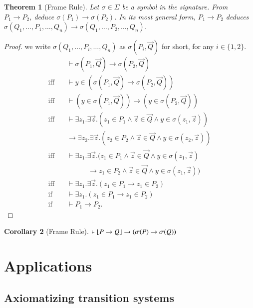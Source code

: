 \documentclass{article}
\theoremstyle{plain}
\newtheorem{thm}{Theorem}
\newtheorem{cor}[thm]{Corollary}
\DeclarePairedDelimiter\floor{\lfloor}{\rfloor}
\begin{document}
\begin{thm} [Frame Rule]
	Let $\sigma \in \Sigma$ be a symbol in the signature. From $P_1 \to P_2$, deduce $\sigma(P_1) \to \sigma(P_2)$. In its most general form, $P_1 \to P_2$ deduces $\sigma(Q_1,\dots,P_1,\dots,Q_n) \to \sigma(Q_1,\dots, P_2, \dots, Q_n)$.
\end{thm}
\begin{proof}
	we write $\sigma(Q_1,\dots,P_i,\dots,Q_n)$ as $\sigma(P_i,\vec{Q})$ for short, for any $i \in \{1,2\}$.
	\begin{align*}
	&\vdash \sigma(P_1, \vec{Q}) \to \sigma(P_2,\vec{Q}) \\
	\text{iff} \quad &\vdash y \in (\sigma(P_1, \vec{Q}) \to \sigma(P_2,\vec{Q})) \\
	\text{iff} \quad &\vdash (y \in \sigma(P_1, \vec{Q})) \to (y \in \sigma(P_2, \vec{Q})) \\
	\text{iff} \quad &\vdash \exists z_1 . \exists \vec{z} . (z_1 \in P_1 \wedge \vec{z} \in \vec{Q} \wedge y \in \sigma(z_1, \vec{z})) \\
	&\to \exists z_2 . \exists \vec{z} . (z_2 \in P_2 \wedge \vec{z} \in \vec{Q} \wedge y \in \sigma(z_2, \vec{z})) \\
	\text{iff} \quad &\vdash \exists z_1 . \exists \vec{z} . (z_1 \in P_1 \wedge \vec{z} \in \vec{Q} \wedge y \in \sigma(z_1, \vec{z}) \\
	 &\quad \quad \quad \to z_1 \in P_2 \wedge \vec{z} \in \vec{Q} \wedge y \in \sigma(z_1, \vec{z})) \\
	\text{iff} \quad &\vdash \exists z_1. \exists \vec{z} . (z_1 \in P_1 \to z_1 \in P_2) \\
	\text{if} \quad &\vdash \exists z_1 .  (z_1 \in P_1 \to z_1 \in P_2) \\
	\text{if} \quad &\vdash P_1 \to P_2.
	\end{align*}
\end{proof}
\begin{cor} [Frame Rule]
	$\vdash \floor*{P \to Q} \to (\sigma(P) \to \sigma(Q))$
\end{cor}

\section{Applications}

\subsection{Axiomatizing transition systems}
\end{document}
